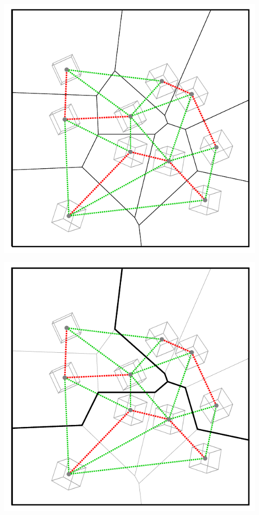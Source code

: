 \begin{frame}[fragile]
\begin{overprint}
\begin{center}
\includegraphics[height=0.9\textheight]{fig/voronoi-iom-adpm}
\par\end{center}


\begin{center}
\includegraphics[height=0.9\textheight]{fig/voronoi-iom-adpmg}
\par\end{center}



\end{overprint}
\end{frame}
